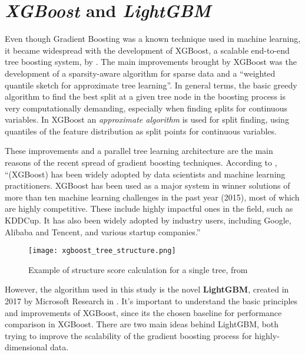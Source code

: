 \section{\textit{XGBoost} and \textit{LightGBM}}

Even though Gradient Boosting was a known technique used in machine learning, it became widespread with the development of XGBoost, a scalable end-to-end tree boosting system, by \cite{chen2016xgboost}. The main improvements brought by XGBoost was the development of a sparsity-aware algorithm for sparse data and a ``weighted quantile sketch for approximate tree learning''. In general terms, the basic greedy algorithm to find the best split at a given tree node in the boosting process is very computationally demanding, especially when finding splits for continuous variables. In XGBoost an \textit{approximate algorithm} is used for split finding, using quantiles of the feature distribution as split points for continuous variables. 

These improvements and a parallel tree learning architecture are the main reasons of the recent spread of gradient boosting techniques. According to \cite{chen2015xgboost}, ``(XGBoost) has been widely adopted by data scientists and machine learning practitioners. XGBoost has been used as a major system in winner solutions of more than ten machine learning challenges in the past year (2015), most of which are highly competitive. These include highly impactful ones in the field, such as KDDCup. It has also been widely adopted by industry users, including Google, Alibaba and Tencent, and various startup companies.''

\begin{figure}[!h]
    \centering
    \texttt{[image: xgboost\_tree\_structure.png]} 
    \caption{Example of structure score calculation for a single tree, from \cite{chen2015xgboost}}
    \label{fig:xgboost-tree} 
  \end{figure}
  

However, the algorithm used in this study is the novel \textbf{LightGBM}, created in 2017 by Microsoft Research in \cite{ke2017lightgbm}. It's important to understand the basic principles and improvements of XGBoost, since its the chosen baseline for performance comparison in XGBoost. There are two main ideas behind LightGBM, both trying to improve the scalability of the gradient boosting process for highly-dimensional data.

